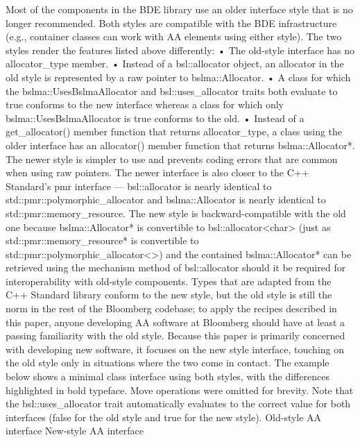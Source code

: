 
Most of the components in the BDE library use an older interface style that is no longer recommended. Both styles are compatible with the BDE infrastructure (e.g., container classes can work with AA elements using either style). The two styles render the features listed above differently: 
•	The old-style interface has no allocator_type member.
•	Instead of a bsl::allocator object, an allocator in the old style is represented by a raw pointer to bslma::Allocator.
•	A class for which the bslma::UsesBslmaAllocator and bsl::uses_allocator traits both evaluate to true conforms to the new interface whereas a class for which only bslma::UsesBslmaAllocator is true conforms to the old.
•	Instead of a get_allocator() member function that returns allocator_type, a class using the older interface has an allocator() member function that returns bslma::Allocator*.
The newer style is simpler to use and prevents coding errors that are common when using raw pointers.  The newer interface is also closer to the C++ Standard’s pmr  interface — bsl::allocator is nearly identical to std::pmr::polymorphic_allocator and bslma::Allocator is nearly identical to std::pmr::memory_resource.   The new style is backward-compatible with the old one because bslma::Allocator* is convertible to bsl::allocator<char> (just as std::pmr::memory_resource* is convertible to std::pmr::polymorphic_allocator<>) and the contained bslma::Allocator* can be retrieved using the mechanism method of bsl::allocator should it be required for interoperability with old-style components.
Types that are adapted from the C++ Standard library conform to the new style, but the old style is still the norm in the rest of the Bloomberg codebase; to apply the recipes described in this paper, anyone developing AA software at Bloomberg should have at least a passing familiarity with the old style. Because this paper is primarily concerned with developing new software, it focuses on the new style interface, touching on the old style only in situations where the two come in contact.
The example below shows a minimal class interface using both styles, with the differences highlighted in bold typeface. Move operations were omitted for brevity. Note that the bsl::uses_allocator trait automatically evaluates to the correct value for both interfaces (false for the old style and true for the new style).
Old-style AA interface	New-style AA interface
